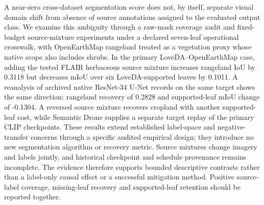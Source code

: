A near-zero cross-dataset segmentation score does not, by itself, separate visual domain shift from absence of source annotations assigned to the evaluated output class. We examine this ambiguity through a raw-mask coverage audit and fixed-budget source-mixture experiments under a declared seven-leaf operational crosswalk, with OpenEarthMap rangeland treated as a vegetation proxy whose native scope also includes shrubs. In the primary LoveDA--OpenEarthMap case, adding the tested FLAIR herbaceous source mixture increases rangeland IoU by 0.3118 but decreases mIoU over six LoveDA-supported leaves by 0.1011. A reanalysis of archived native ResNet-34 U-Net records on the same target shows the same direction: rangeland recovery of 0.2828 and supported-leaf mIoU change of -0.1304. A reversed source mixture recovers cropland with another supported-leaf cost, while Semantic Drone supplies a separate target replay of the primary CLIP checkpoints. These results extend established label-space and negative-transfer concerns through a specific audited empirical design; they introduce no new segmentation algorithm or recovery metric. Source mixtures change imagery and labels jointly, and historical checkpoint and schedule provenance remains incomplete. The evidence therefore supports bounded descriptive contrasts rather than a label-only causal effect or a successful mitigation method. Positive source-label coverage, missing-leaf recovery and supported-leaf retention should be reported together.
